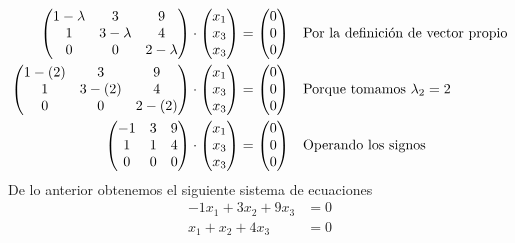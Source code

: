 \documentclass[letterpaper]{article}
\renewcommand{\*}{\cdot}
\theoremstyle{definition}
\begin{document}
\begin{align*}
	\begin{pmatrix}
	1- \lambda & 3 & 9\\
	1 & 3 -\lambda & 4\\
	0 & 0 & 2- \lambda 
	\end{pmatrix} \* \begin{pmatrix}
	x_1\\
	x_3\\
	x_3
	\end{pmatrix} &= \begin{pmatrix}
	0\\
	0\\
	0
	\end{pmatrix} && \text{Por la definición de vector propio}\\ 
	\begin{pmatrix}
	1- (2) & 3 & 9\\
	1 & 3 -(2) & 4\\
	0 & 0 & 2- (2) 
	\end{pmatrix} \* \begin{pmatrix}
	x_1\\
	x_3\\
	x_3
	\end{pmatrix} &= \begin{pmatrix}
	0\\
	0\\
	0
	\end{pmatrix} && \text{Porque tomamos $ \lambda_2 = 2 $}\\
	\begin{pmatrix}
	-1 & 3 & 9\\
	1 & 1 & 4\\
	0 & 0 &  0 
	\end{pmatrix} \* \begin{pmatrix}
	x_1\\
	x_3\\
	x_3
	\end{pmatrix} &= \begin{pmatrix}
	0\\
	0\\
	0
	\end{pmatrix} && \text{Operando los signos}\\
\end{align*}
De lo anterior obtenemos el siguiente sistema de ecuaciones
\begin{align}
	-1x_1 + 3x_2 + 9x_3 &= 0\\
	x_1 +x_2 +4x_3 &= 0
\end{align}
\end{document}
